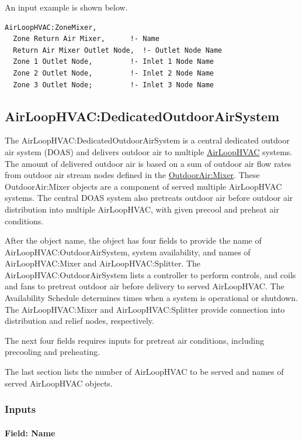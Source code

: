 An input example is shown below.

\begin{lstlisting}
AirLoopHVAC:ZoneMixer,
  Zone Return Air Mixer,      !- Name
  Return Air Mixer Outlet Node,  !- Outlet Node Name
  Zone 1 Outlet Node,         !- Inlet 1 Node Name
  Zone 2 Outlet Node,         !- Inlet 2 Node Name
  Zone 3 Outlet Node;         !- Inlet 3 Node Name
\end{lstlisting}

\subsection{AirLoopHVAC:DedicatedOutdoorAirSystem}\label{airloophvacdedicatedoutdoorairsystem}

The AirLoopHVAC:DedicatedOutdoorAirSystem is a central dedicated outdoor air system (DOAS) and delivers outdoor air to multiple \hyperref[airloophvac]{AirLoopHVAC} systems. The amount of delivered outdoor air is based on a sum of outdoor air flow rates from outdoor air stream nodes defined in the \hyperref[outdoorairmixer]{OutdoorAir:Mixer}. These OutdoorAir:Mixer objects are a component of served multiple AirLoopHVAC systems. The central DOAS system also pretreats outdoor air before outdoor air distribution into multiple AirLoopHVAC, with given precool and preheat air conditions.

After the object name, the object has four fields to provide the name of AirLoopHVAC:OutdoorAirSystem, system availability, and names of AirLoopHVAC:Mixer and AirLoopHVAC:Splitter. The AirLoopHVAC:OutdoorAirSystem lists a controller to perform controls, and coils and fans to pretreat outdoor air before delivery to served AirLoopHVAC. The Availability Schedule determines times when a system is operational or shutdown. The AirLoopHVAC:Mixer and AirLoopHVAC:Splitter provide connection into distribution and relief nodes, respectively.

The next four fields requires inputs for pretreat air conditions, including precooling and preheating.

The last section lists the number of AirLoopHVAC to be served and names of served AirLoopHVAC objects.

\subsubsection{Inputs}

\paragraph{Field: Name}

